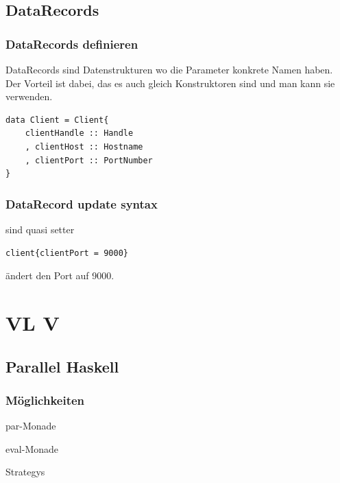 \documentclass[ngerman,a4paper]{report}
\begin{document}
\section{DataRecords}
\subsection{DataRecords definieren}
DataRecords sind Datenstrukturen wo die Parameter konkrete Namen haben. Der Vorteil ist dabei, das es auch gleich Konstruktoren sind und man kann sie verwenden.
\begin{lstlisting}
data Client = Client{
	clientHandle :: Handle
	, clientHost :: Hostname
	, clientPort :: PortNumber
}
\end{lstlisting}

\subsection{DataRecord update syntax}
sind quasi setter
\begin{lstlisting}
client{clientPort = 9000}
\end{lstlisting}
ändert den Port auf 9000.\\

\chapter{VL V}
\section{Parallel Haskell}
\subsection{Möglichkeiten}
\begin{compactitem}
\item par-Monade
\item eval-Monade
\item Strategys
\end{compactitem}
\end{document}
